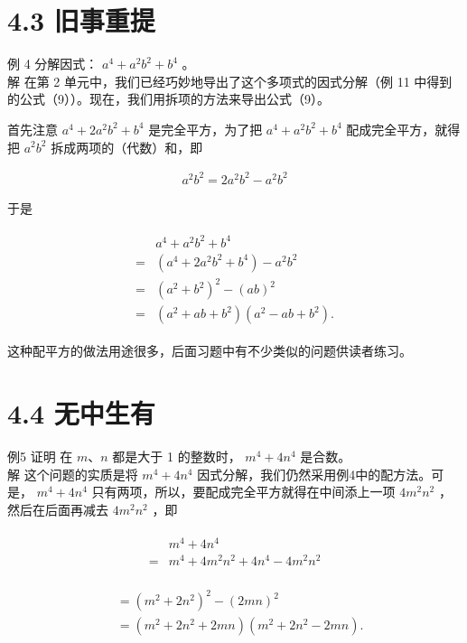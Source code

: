 \documentclass[10pt]{article}
\begin{document}
\section*{4.3 旧事重提}
例 4 分解因式： $a^{4}+a^{2} b^{2}+b^{4}$ 。\\
解 在第 2 单元中，我们已经巧妙地导出了这个多项式的因式分解（例 11 中得到的公式（9））。现在，我们用拆项的方法来导出公式（9）。

首先注意 $a^{4}+2 a^{2} b^{2}+b^{4}$ 是完全平方，为了把 $a^{4}+a^{2} b^{2}+b^{4}$ 配成完全平方，就得把 $a^{2} b^{2}$ 拆成两项的（代数）和，即

\begin{align*}
a^{2} b^{2}=2 a^{2} b^{2}-a^{2} b^{2}
\end{align*}

于是

\begin{align*}
\begin{aligned}
& a^{4}+a^{2} b^{2}+b^{4} \\
= & \left(a^{4}+2 a^{2} b^{2}+b^{4}\right)-a^{2} b^{2} \\
= & \left(a^{2}+b^{2}\right)^{2}-(a b)^{2} \\
= & \left(a^{2}+a b+b^{2}\right)\left(a^{2}-a b+b^{2}\right) .
\end{aligned}
\end{align*}

这种配平方的做法用途很多，后面习题中有不少类似的问题供读者练习。

\section*{4.4 无中生有}
例5 证明 在 $m 、 n$ 都是大于 1 的整数时， $m^{4}+4 n^{4}$ 是合数。\\
解 这个问题的实质是将 $m^{4}+4 n^{4}$ 因式分解，我们仍然采用例4中的配方法。可是， $m^{4}+4 n^{4}$ 只有两项，所以，要配成完全平方就得在中间添上一项 $4 m^{2} n^{2}$ ，然后在后面再减去 $4 m^{2} n^{2}$ ，即

\begin{align*}
\begin{aligned}
& m^{4}+4 n^{4} \\
= & m^{4}+4 m^{2} n^{2}+4 n^{4}-4 m^{2} n^{2}
\end{aligned}
\end{align*}

\begin{align*}
\begin{aligned}
& =\left(m^{2}+2 n^{2}\right)^{2}-(2 m n)^{2} \\
& =\left(m^{2}+2 n^{2}+2 m n\right)\left(m^{2}+2 n^{2}-2 m n\right) .
\end{aligned}
\end{align*}
\end{document}
